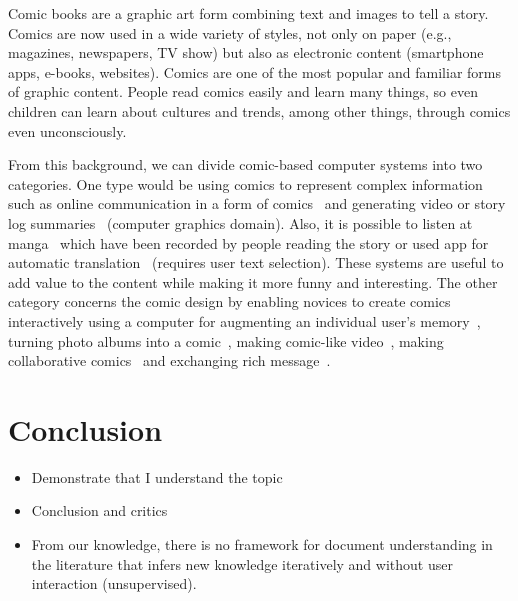 Comic books are a graphic art form combining text and images to tell a story.
Comics are now used in a wide variety of styles, not only on paper (e.g., magazines, newspapers, TV show) but also as electronic content (smartphone apps, e-books, websites).
Comics are one of the most popular and familiar forms of graphic content.
People read comics easily and learn many things, so even children can learn about cultures and trends, among other things, through comics even unconsciously.

From this background, we can divide comic-based computer systems into two categories.
One type would be using comics to represent complex information such as online communication in a form of comics~\cite{Kurlander1996} and generating video or story log summaries~\cite{Uchihashi1999Video,Alves2008So,Shamir2006Generating} (computer graphics domain).
Also, it is possible to listen at manga~\cite{Vomic} which have been recorded by people reading the story or used app for automatic translation~\cite{OCRMangaReader,Capture2Text} (requires user text selection).
These systems are useful to add value to the content while making it more funny and interesting.
The other category concerns the comic design by enabling novices to create comics  interactively using a computer for augmenting an individual user's memory~\cite{SumiSNM2002Comic}, turning photo albums into a comic~\cite{ComicLife3}, making comic-like video~\cite{Raulet2011Sketch}, making collaborative comics~\cite{Ricardo2009Calligraphic} and exchanging rich message~\cite{Salovaara2007Appropriation}.




\section{Conclusion}
\label{sec:sota:conclusion}


\begin{itemize}
	\item Demonstrate that I understand the topic
	\item Conclusion and critics
	\item From our knowledge, there is no framework for document understanding in the literature that infers new knowledge iteratively and without user interaction (unsupervised).

\end{itemize}

